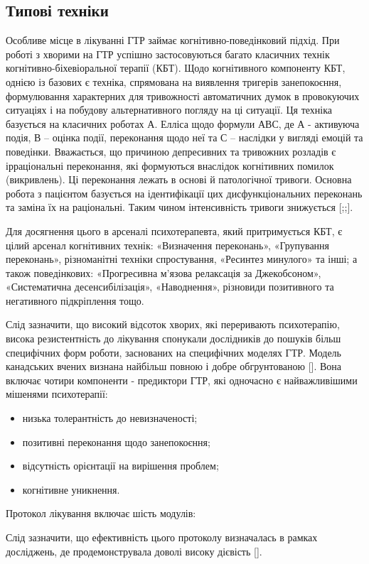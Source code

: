 \documentclass[twocolumn]{article}
\begin{document}
\subsection {Типові техніки}
\par Особливе місце в лікуванні ГТР займає когнітивно-поведінковий підхід. При роботі з хворими на ГТР успішно застосовуються багато класичних технік когнітивно-біхевіоральної терапії (КБТ). Щодо когнітивного компоненту КБТ, однією із базових є техніка, спрямована на виявлення тригерів занепокоєння, формулювання характерних для тривожності автоматичних думок в провокуючих ситуаціях і на побудову альтернативного погляду на ці ситуації. Ця техніка базується на класичних роботах А. Елліса щодо формули АВС, де А - активуюча подія, В – оцінка події, переконання щодо неї та С – наслідки у вигляді емоцій та поведінки. Вважається, що причиною депресивних та тривожних розладів є ірраціональні переконання, які формуються внаслідок когнітивних помилок (викривлень). Ці переконання лежать в основі й патологічної тривоги. Основна робота з пацієнтом базується на ідентифікації цих дисфункціональних переконань та заміна їх на раціональні. Таким чином інтенсивність тривоги знижується [\cite{bib12};\cite{bib13};\cite{bib14}].
\par Для досягнення цього в арсеналі психотерапевта, який притримується КБТ, є цілий арсенал когнітивних технік: «Визначення переконань», «Групування переконань», різноманітні техніки спростування, «Ресинтез минулого» та інші; а також поведінкових: «Прогресивна м'язова релаксація за Джекобсоном», «Систематична десенсибілізація», «Наводнення», різновиди позитивного та негативного підкріплення тощо. 
\par Слід зазначити, що високий відсоток хворих, які переривають психотерапію, висока резистентність до лікування спонукали дослідників до пошуків більш специфічних форм роботи, заснованих на специфічних моделях ГТР. Модель канадських вчених визнана найбільш повною і добре обгрунтованою [\cite{bib11}]. Вона включає чотири компоненти - предиктори ГТР, які одночасно є найважливішими мішенями психотерапії:
\begin{itemize}
\item низька толерантність до невизначеності;
\item позитивні переконання щодо занепокоєння;
\item відсутність орієнтації на вирішення проблем;
\item когнітивне уникнення.
\end{itemize}
\par Протокол лікування включає шість модулів: 
\par Слід зазначити, що ефективність цього протоколу визначалась в рамках досліджень, де продемонструвала доволі високу дієвість [\cite{bib15}].
\end{document}
